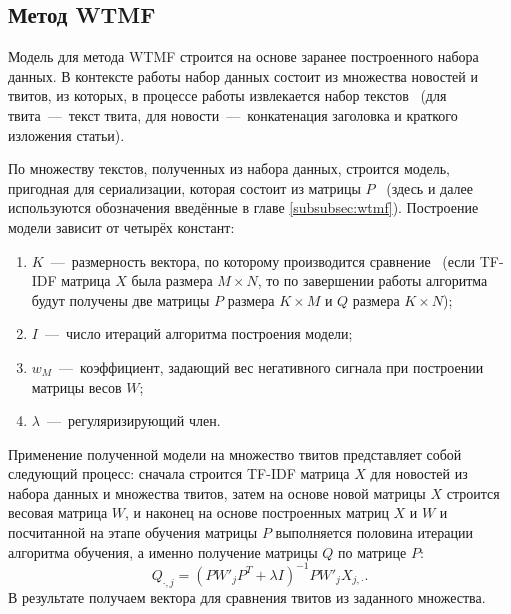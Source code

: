 \subsection{Метод WTMF}
    Модель для метода WTMF строится на основе заранее построенного набора данных.
    В контексте работы набор данных состоит из множества новостей и твитов, из которых, в процессе работы извлекается набор текстов
    ~(для твита~---~текст твита, для новости~---~конкатенация заголовка и краткого изложения статьи).

    По множеству текстов, полученных из набора данных, строится модель, пригодная для сериализации, которая состоит из матрицы $P$
    ~(здесь и далее используются обозначения введённые в главе \ref{subsubsec:wtmf}).
    Построение модели зависит от четырёх констант:
    \begin{enumerate}
        \item $K$~---~размерность вектора, по которому производится сравнение~
        (если TF-IDF матрица $X$ была размера $M \times N$, то по завершении работы алгоритма будут получены две матрицы $P$ размера $K \times M$ и $Q$ размера $K \times N$);
        \item $I$~---~число итераций алгоритма построения модели;
        \item $w_M$~---~коэффициент, задающий вес негативного сигнала при построении матрицы весов $W$;
        \item $\lambda$~---~регуляризирующий член.
    \end{enumerate}

    Применение полученной модели на множество твитов представляет собой следующий процесс:
    сначала строится TF-IDF матрица $X$ для новостей из набора данных и множества твитов, затем на основе новой матрицы $X$ строится весовая матрица $W$,
    и наконец на основе построенных матриц $X$ и $W$ и посчитанной на этапе обучения матрицы $P$ выполняется половина итерации алгоритма обучения,
    а именно получение матрицы $Q$ по матрице $P$:
    $$Q_{\cdot, j} = (P W'_j P^T + \lambda I)^{-1} P W'_j X_{j,\cdot}.$$
    В результате получаем вектора для сравнения твитов из заданного множества.